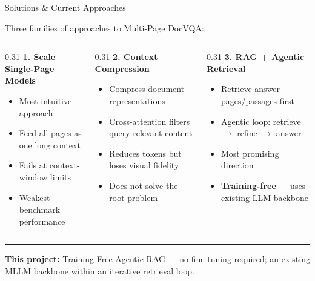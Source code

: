 \documentclass[aspectratio=169]{beamer}
\begin{document}
\begin{frame}{Solutions \& Current Approaches}

  Three families of approaches to Multi-Page DocVQA:

  \vspace{0.3cm}

  \begin{columns}[T]

    \begin{column}{0.31\textwidth}
      \textbf{1. Scale Single-Page Models}
      \vspace{0.1cm}
      \begin{itemize}\small
        \item Most intuitive approach
        \item Feed all pages as one long context
        \item Fails at context-window limits
        \item Weakest benchmark performance
      \end{itemize}
    \end{column}

    \begin{column}{0.31\textwidth}
      \textbf{2. Context Compression}
      \vspace{0.1cm}
      \begin{itemize}\small
        \item Compress document representations
        \item Cross-attention filters query-relevant content
        \item Reduces tokens but loses visual fidelity
        \item Does not solve the root problem
      \end{itemize}
    \end{column}

    \begin{column}{0.31\textwidth}
      \textbf{3. RAG + Agentic Retrieval}
      \vspace{0.1cm}
      \begin{itemize}\small
        \item Retrieve answer pages/passages first
        \item Agentic loop: retrieve $\to$ refine $\to$ answer
        \item Most promising direction
        \item \textbf{Training-free} — uses existing LLM backbone
      \end{itemize}
    \end{column}

  \end{columns}

  \vspace{0.4cm}
  \hrule
  \vspace{0.2cm}
  \small\textbf{This project:} Training-Free Agentic RAG — no fine-tuning
  required; an existing MLLM backbone within an iterative retrieval loop.

\end{frame}

\end{document}
